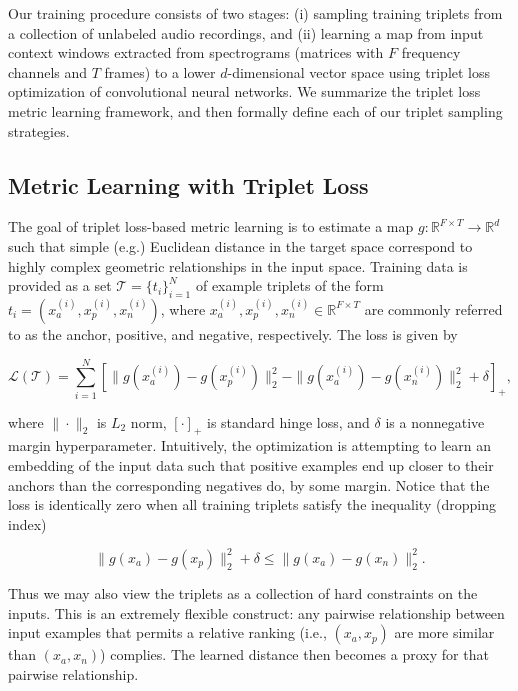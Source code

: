 \documentclass{article}
\begin{document}
Our training procedure consists of two stages: (i) sampling training triplets
from a collection of unlabeled audio recordings, and (ii) learning a map from
input context windows extracted from spectrograms (matrices with $F$
frequency channels and $T$ frames) to a lower $d$-dimensional vector space using
triplet loss optimization of convolutional neural networks. We summarize the
triplet loss metric learning framework, and then formally define each of our
triplet sampling strategies.

\subsection{Metric Learning with Triplet Loss}

The goal of triplet loss-based metric learning is to estimate a map $g:
\mathbb{R}^{F\times T} \rightarrow \mathbb{R}^d$ such that simple (e.g.)
Euclidean distance in the target space correspond to highly complex geometric
relationships in the input space.  Training data is provided as a set
$\mathcal{T} = \{t_i\}_{i=1}^N$ of example triplets of the form
$t_i\!=\!(x_a^{(i)},x_p^{(i)},x_n^{(i)})$, where $x_a^{(i)}, x_p^{(i)},
  x_n^{(i)}\!\in\!\mathbb{R}^{F\times T}$ are commonly referred to as the anchor,
  positive, and negative, respectively. The loss is given by

\begin{equation}
  \mathcal{L}(\mathcal{T}) = \sum_{i=1}^N \left[ \|g(x_a^{(i)})\!-\!g(x_p^{(i)})\|_2^2 -
    \|g(x_a^{(i)})\!-\!g(x_n^{(i)})\|_2^2 + \delta \right]_+,
  \label{eq:loss}
\end{equation}

\noindent
where $\|\!\cdot\!\|_2$ is $L_2$ norm, $[\cdot]_+$ is standard hinge loss, and
$\delta$ is a nonnegative margin hyperparameter.  Intuitively, the optimization
is attempting to learn an embedding of the input data such that positive
examples end up closer to their anchors than the corresponding negatives do, by
some margin.  Notice that the loss is identically zero when all training
triplets satisfy the inequality (dropping index)

\begin{equation}
  \|g(x_a)-g(x_p)\|_2^2 + \delta \leq \|g(x_a)-g(x_n)\|_2^2.
  \label{eq:ineq}
\end{equation}

\noindent
Thus we may also view the triplets as a collection of hard constraints on the
inputs.  This is an extremely flexible construct: any pairwise relationship
between input examples that permits a relative ranking (i.e., $(x_a,x_p)$ are
more similar than $(x_a,x_n)$) complies.  The learned distance then becomes a
proxy for that pairwise relationship.
\end{document}
